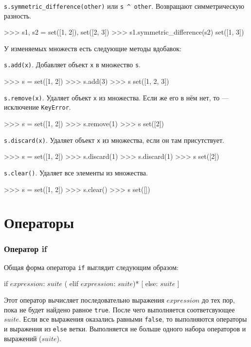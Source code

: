 \lstinline{s.symmetric_difference(other)} или \lstinline{s ^ other}. Возвращают симметрическую разность.
\begin{pylst}{}{}
>>> s1, s2 = set([1, 2]), set([2, 3])
>>> s1.symmetric_difference(s2)
set([1, 3])
\end{pylst}

У изменяемых множеств есть следующие методы вдобавок:

\lstinline{s.add(x)}. Добавляет объект \lstinline{x} в множество \lstinline{s}.
\begin{pylst}{}{}
>>> s = set([1, 2])
>>> s.add(3)
>>> s
set([1, 2, 3])
\end{pylst}

\lstinline{s.remove(x)}. Удаляет объект \lstinline{x} из множества. Если же его в нём нет, то — исключение \lstinline{KeyError}.
\begin{pylst}{}{}
>>> s = set([1, 2])
>>> s.remove(1)
>>> s
set([2])
\end{pylst}

\lstinline{s.discard(x)}. Удаляет объект \lstinline{x} из множества, если он там присутствует.
\begin{pylst}{}{}
>>> s = set([1, 2])
>>> s.discard(1)
>>> s.discard(1)
>>> s
set([2])
\end{pylst}

\lstinline{s.clear()}. Удаляет все элементы из множества.
\begin{pylst}{}{}
>>> s = set([1, 2])
>>> s.clear()
>>> s
set([])
\end{pylst}

\section{Операторы}
\label{sec:py-statements}

\subsubsection{Оператор if}
Общая форма оператора \lstinline{if} выглядит следующим образом:
\begin{pylst}{}{}
if $expression$: $suite$
( elif $expression$: $suite$)*
[ else: $suite$ ]
\end{pylst}

Этот оператор вычисляет последовательно выражения $expression$ до тех пор, пока не будет найдено равное \lstinline{true}. После чего выполняется соответсвующее $suite$. Если все выражения оказались равными \lstinline{false}, то выполняются операторы и выражения из \lstinline{else} ветки. Выполняется не больше одного набора операторов и выражений ($suite$).

